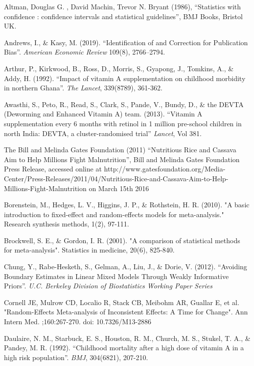 \documentclass[12pt]{article}
\begin{document}
\begin{thebibliography}{99}

 Altman,  Douglas G. , David Machin, Trevor N. Bryant (1986), ``Statistics with confidence : confidence intervals and statistical guidelines'', BMJ Books, Bristol UK. 

 Andrews, I., \& Kasy, M. (2019). ``Identification of and Correction for Publication Bias''. \emph{American Economic Review} 109(8), 2766--2794.

 Arthur, P., Kirkwood, B., Ross, D., Morris, S., Gyapong, J., Tomkins, A., \& Addy, H. (1992). ``Impact of vitamin A supplementation on childhood morbidity in northern Ghana''. \emph{The Lancet}, 339(8789), 361-362.

 Awasthi, S., Peto, R., Read, S., Clark, S., Pande, V., Bundy, D., \& the DEVTA (Deworming and Enhanced Vitamin A) team. (2013). ``Vitamin A supplementation every 6 months with retinol in 1 million pre-school children in north India: DEVTA, a cluster-randomised trial'' \emph{Lancet}, Vol 381.

 The Bill and Melinda Gates Foundation (2011) ``Nutritious Rice and Cassava Aim to Help Millions Fight Malnutrition'', Bill and Melinda Gates Foundation Press Release, accessed online at http://www.gatesfoundation.org/Media-Center/Press-Releases/2011/04/Nutritious-Rice-and-Cassava-Aim-to-Help-Millions-Fight-Malnutrition on March 15th 2016 

 Borenstein, M., Hedges, L. V., Higgins, J. P., \& Rothstein, H. R. (2010). "A basic introduction to fixed-effect and random-effects models for meta-analysis." Research synthesis methods, 1(2), 97-111.

 Brockwell, S. E., \& Gordon, I. R. (2001). "A comparison of statistical methods for meta-analysis". Statistics in medicine, 20(6), 825-840.

 Chung, Y., Rabe-Hesketh, S., Gelman, A., Liu, J., \& Dorie, V. (2012). ``Avoiding Boundary Estimates in Linear Mixed Models Through Weakly Informative Priors''. \emph{U.C. Berkeley Division of Biostatistics Working Paper Series}

 Cornell JE, Mulrow CD, Localio R, Stack CB, Meibohm AR, Guallar E, et al. "Random-Effects Meta-analysis of Inconsistent Effects: A Time for Change". Ann Intern Med. ;160:267-270. doi: 10.7326/M13-2886

 Daulaire, N. M., Starbuck, E. S., Houston, R. M., Church, M. S., Stukel, T. A., \& Pandey, M. R. (1992). ``Childhood mortality after a high dose of vitamin A in a high risk population''. \emph{BMJ}, 304(6821), 207-210.


\end{thebibliography}
\end{document}
